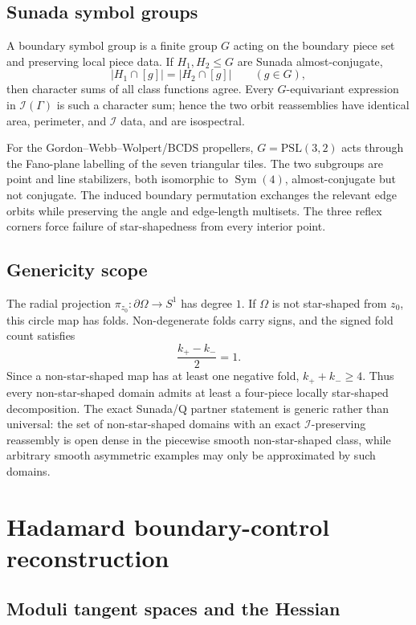 \documentclass[11pt,reqno]{amsart}
\theoremstyle{plain}
\theoremstyle{definition}
\theoremstyle{remark}
\DeclareMathOperator{\Sym}{Sym}
\newcommand{\Icalbb}{\mathcal{I}}
\begin{document}
\subsection{Sunada symbol groups}\label{app:ss-sunada}

A boundary symbol group is a finite group $G$ acting on the boundary piece set and preserving local piece data. If $H_1,H_2\leq G$ are Sunada almost-conjugate,
\[
|H_1\cap[g]|=|H_2\cap[g]|\qquad(g\in G),
\]
then character sums of all class functions agree. Every $G$-equivariant expression in $\Icalbb(\Gamma)$ is such a character sum; hence the two orbit reassemblies have identical area, perimeter, and $\Icalbb$ data, and are isospectral.

For the Gordon--Webb--Wolpert/BCDS propellers, $G=\mathrm{PSL}(3,2)$ acts through the Fano-plane labelling of the seven triangular tiles. The two subgroups are point and line stabilizers, both isomorphic to $\Sym(4)$, almost-conjugate but not conjugate. The induced boundary permutation exchanges the relevant edge orbits while preserving the angle and edge-length multisets. The three reflex corners force failure of star-shapedness from every interior point.

\subsection{Genericity scope}\label{app:ss-genericity-scope}

The radial projection $\pi_{z_0}\colon\partial\Omega\to S^1$ has degree $1$. If $\Omega$ is not star-shaped from $z_0$, this circle map has folds. Non-degenerate folds carry signs, and the signed fold count satisfies
\[
\frac{k_+-k_-}{2}=1.
\]
Since a non-star-shaped map has at least one negative fold, $k_++k_-\geq4$. Thus every non-star-shaped domain admits at least a four-piece locally star-shaped decomposition. The exact Sunada/Q partner statement is generic rather than universal: the set of non-star-shaped domains with an exact $\Icalbb$-preserving reassembly is open dense in the piecewise smooth non-star-shaped class, while arbitrary smooth asymmetric examples may only be approximated by such domains.

\section{Hadamard boundary-control reconstruction}\label{app:hadamard-details}

\subsection{Moduli tangent spaces and the Hessian}\label{app:ss-had-setup}
\end{document}
